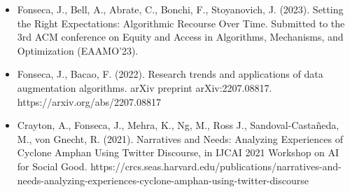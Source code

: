 \begin{itemize}

    \item Fonseca, J., Bell, A., Abrate, C., Bonchi, F., Stoyanovich, J.
        (2023). Setting the Right Expectations: Algorithmic Recourse Over
        Time. Submitted to the 3rd ACM conference on Equity and Access in
        Algorithms, Mechanisms, and Optimization (EAAMO'23).

    \item Fonseca, J., Bacao, F. (2022). Research trends and applications of
        data augmentation algorithms. arXiv preprint arXiv:2207.08817.
        https://arxiv.org/abs/2207.08817

    \item Crayton, A., Fonseca, J., Mehra, K., Ng, M., Ross J.,
        Sandoval-Castañeda, M., von Gnecht, R. (2021). Narratives and Needs:
        Analyzing Experiences of Cyclone Amphan Using Twitter Discourse, in
        IJCAI 2021 Workshop on AI for Social Good.
        https://crcs.seas.harvard.edu/publications/narratives-and-needs-analyzing-experiences-cyclone-amphan-using-twitter-discourse

\end{itemize}
